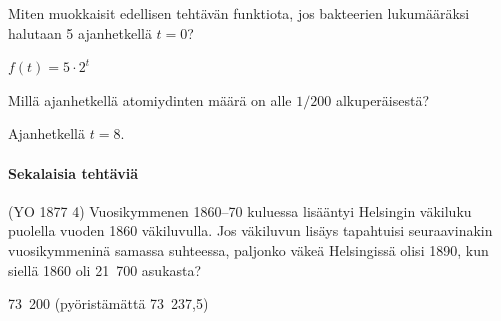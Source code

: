 \begin{tehtavasivu}
\begin{tehtava}
Miten muokkaisit edellisen tehtävän funktiota, jos bakteerien lukumääräksi
halutaan 5 ajanhetkellä $t = 0$?
\begin{vastaus}
$f(t) = 5 \cdot 2^t$
\end{vastaus}
\end{tehtava}

\begin{tehtava}
Millä ajanhetkellä atomiydinten määrä on alle $1/200$ alkuperäisestä?
\begin{vastaus}
Ajanhetkellä $t = 8$.
\end{vastaus}
\end{tehtava}

\paragraph*{Sekalaisia tehtäviä}

\begin{tehtava}
(YO 1877 4) Vuosikymmenen 1860--70 kuluessa lisääntyi Helsingin väkiluku puolella vuoden 1860 väkiluvulla. Jos väkiluvun lisäys tapahtuisi seuraavinakin vuosikymmeninä samassa suhteessa, paljonko väkeä Helsingissä olisi 1890, kun siellä 1860 oli 21~700 asukasta? 
	\begin{vastaus}
	73~200 (pyöristämättä 73~237,5)
	\end{vastaus}
\end{tehtava}

\end{tehtavasivu}

